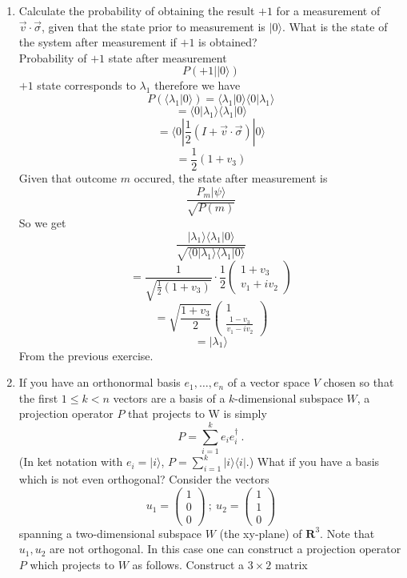 \documentclass[12pt]{article}
\newcommand{\mbf}[1] {{\mathbf{#1}}}
\newcommand{\ket}[1]{\vert{#1}\rangle}
\newcommand{\bra}[1]{\langle{#1}\vert}
\newcommand{\Rmath}{\mbf{R}}
\begin{document}
\begin{enumerate}
\item Calculate the probability of obtaining the result $+1$ for a measurement of $\vec{v} \cdot \vec{\sigma}$, given that the state prior to measurement is $\ket{0}$. What is the state of the system after measurement if $+1$ is obtained? 
\\
Probability of $+1$ state after measurement 
$$ P(+1 | \ket{0})$$
$+1$ state corresponds to $\lambda_1$ therefore we have 
$$ P(\langle \lambda_1  \ket{0}) = \langle \lambda_1 | 0 \rangle \langle 0 | \lambda_1 \rangle $$ 
$$ = \langle 0 | \lambda_1 \rangle \langle \lambda_1 | 0 \rangle $$
$$ = \langle 0 | \frac{1}{2} ( I + \vec{v} \cdot \vec{\sigma}) | 0\rangle $$
$$ = \frac{1}{2} (1 + v_3) $$
Given that outcome $m$ occured, the state after measurement is 
$$ \frac{P_m \ket{\psi}}{\sqrt{P(m)}} $$
So we get 
$$ \frac{\ket{\lambda_1} \langle \lambda_1 | 0 \rangle}{\sqrt{\langle 0 | \lambda_1 \rangle \langle \lambda_1 | 0 \rangle}} $$
$$ = \frac{1}{\sqrt{\frac{1}{2}(1+v_3)}} \cdot \frac{1}{2} \left( \begin{array}{cc} 1+v_3 \\ v_1+iv_2 \end{array} \right)$$
$$ = \sqrt{\frac{1+v_3}{2}} \left( \begin{array}{cc} 1 \\ \frac{1-v_3}{v_1 -iv_2} \end{array} \right)$$
$$ = \ket{\lambda_1} $$ 
From the previous exercise. 
\item If you have an orthonormal basis ${e_1,\ldots ,e_n}$ of a vector space $V$ chosen so that the first $1\leq k<n$ vectors are a basis of a $k$-dimensional subspace $W$,
a projection operator $P$ that projects to W is simply
$$
P = \sum^k_{i=1} e_i e^\dagger_i \ .  
$$
(In ket notation with $e_i = \ket{i}$, $P = \sum^k_{i=1} \ket{i}\bra{i}$.)  What if you have a basis which is not even orthogonal? Consider the vectors
$$
u_1 = \left( \begin{array}{c} 1 \\ 0 \\ 0 \end{array} \right) \ ;  \  u_2 = \left( \begin{array}{c} 1 \\ 1 \\ 0 \end{array} \right) 
$$
spanning a two-dimensional subspace $W$ (the xy-plane) of $\Rmath^3$. Note that $u_1,u_2$ are not orthogonal. In this case one can construct a projection operator $P$ which
projects to $W$ as follows. Construct a $3\times 2$ matrix

\end{enumerate}
\end{document}
